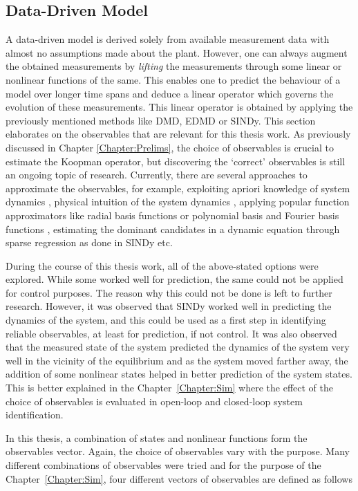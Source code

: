 \subsection{Data-Driven Model}
\label{Chapter:Data}
A data-driven model is derived solely from available measurement data with almost no assumptions made about the plant. However, one can always augment the obtained measurements by \textit{lifting} the measurements through some linear or nonlinear functions of the same. This enables one to predict the behaviour of a model over longer time spans and deduce a linear operator which governs the evolution of these measurements. This linear operator is obtained by applying the previously mentioned methods like DMD, EDMD or SINDy. This section elaborates on the observables that are relevant for this thesis work. As previously discussed in Chapter \ref{Chapter:Prelims}, the choice of observables is crucial to estimate the Koopman operator, but discovering the `correct' observables is still an ongoing topic of research. Currently, there are several approaches to approximate the observables, for example, exploiting apriori knowledge of system dynamics \cite{Brunton_K_invariant_sub}, physical intuition of the system dynamics \cite{Cisneros.2020}, applying popular function approximators like radial basis functions \cite{Korda_edmd_conv} or polynomial basis and Fourier basis functions \cite{Abraham}, estimating the dominant candidates in a dynamic equation through sparse regression as done in SINDy \cite{SINDy} etc. \par 
During the course of this thesis work, all of the above-stated options were explored. While some worked well for prediction, the same could not be applied for control purposes. The reason why this could not be done is left to further research. However, it was observed that SINDy worked well in predicting the dynamics of the system, and this could be used as a first step in identifying reliable observables, at least for prediction, if not control. It was also observed that the measured state of the system predicted the dynamics of the system very well in the vicinity of the equilibrium and as the system moved farther away, the addition of some nonlinear states helped in better prediction of the system states. This is better explained in the Chapter~\ref{Chapter:Sim} where the effect of the choice of observables is evaluated in open-loop and closed-loop system identification.
\par 
In this thesis, a combination of states and nonlinear functions form the observables vector. Again, the choice of observables vary with the purpose. Many different combinations of observables were tried and for the purpose of the Chapter~\ref{Chapter:Sim}, four different vectors of observables are defined as follows
